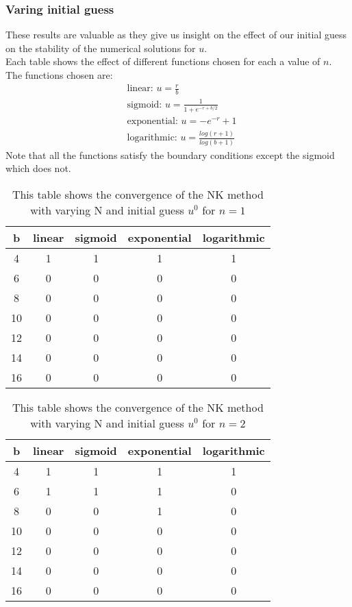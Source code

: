 \documentclass{article}
\begin{document}
\subsubsection{Varing initial guess}
These results are valuable as they give us insight on the effect of our initial guess on the stability of the numerical solutions for $u$. \\
Each table shows the effect of different functions chosen for each a value of $n$. The functions chosen are:
\begin{align*}
&\text{linear: } u = \frac{r}{b}  \\
&\text{sigmoid: } u = \frac{1}{1+e^{-r + b/2}} \\
&\text{exponential: } u = -e^{-r} + 1 \\
&\text{logarithmic: } u = \frac{log(r+1)}{log(b+1)} 
\end{align*}
Note that all the functions satisfy the boundary conditions except the sigmoid which does not. 
\begin{table}[H]
\centering
\begin{tabular}{|c|c|c|c|c|}
\hline
b                                          & linear  & sigmoid & exponential & logarithmic \\
\hline
4  & 1 & 1 & 1 & 1\\
6  & 0 & 0 & 0 & 0\\
8  & 0 & 0 & 0 & 0 \\
10 & 0 & 0 & 0 & 0 \\
12 & 0 & 0 & 0 & 0 \\
14 & 0 & 0 & 0 & 0 \\
16 & 0 & 0 & 0 & 0 \\
\hline
\end{tabular}
\caption{This table shows the convergence of the NK method with varying N and initial guess $u^0$ for $n=1$}
\end{table}
\begin{table}[H]
\centering
\begin{tabular}{|c|c|c|c|c|}
\hline
b                                          & linear  & sigmoid & exponential & logarithmic \\
\hline
4                                          & 1 & 1 & 1 &1\\
6                                          & 1 & 1 & 1 &0\\
8                                          & 0 & 0 & 1 &0\\
10                                         & 0 & 0 & 0 &0\\
12                                         & 0 & 0 & 0 &0\\
14                                         & 0 & 0 & 0 &0\\
16                                         & 0 & 0 & 0 &0\\
\hline
\end{tabular}
\caption{This table shows the convergence of the NK method with varying N and initial guess $u^0$ for $n=2$}
\end{table}
\end{document}
